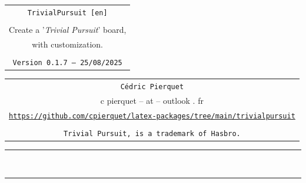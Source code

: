 \documentclass[11pt,a4paper]{ltxdoc}
\def\TPversion{0.1.7}
\def\TPdate{25/08/2025}
\begin{document}
\pagestyle{fancy}

\thispagestyle{empty}

\begin{center}
	\begin{minipage}{0.88\linewidth}
	\begin{tcolorbox}[colframe=yellow,colback=yellow!15]
		\begin{center}
			\begin{tabular}{c}
				{\Huge \texttt{TrivialPursuit [en]}}\\
				\\
				{\LARGE Create a '\textit{Trivial Pursuit}' board,} \\
				{\LARGE with customization.} \\
				\\
				{\small \texttt{Version \TPversion{} -- \TPdate}}
		\end{tabular}
		\end{center}
	\end{tcolorbox}
\end{minipage}
\end{center}

\begin{center}
	\begin{tabular}{c}
	\texttt{Cédric Pierquet}\\
	{\ttfamily c pierquet -- at -- outlook . fr}\\
	\texttt{\url{https://github.com/cpierquet/latex-packages/tree/main/trivialpursuit}} \\
	\\
	\texttt{Trivial Pursuit\texttrademark, is a trademark of Hasbro.}
\end{tabular}
\end{center}

\hrule

\vfill

\begin{tcolorbox}[colframe=lightgray,colback=lightgray!5]
\BoardTrivialPursuit
\end{tcolorbox}

\vfill~

\pagebreak


\hypertarget{matoc}{}

\tableofcontents

\vspace*{5mm}

\hrule

\vspace*{5mm}
\end{document}
